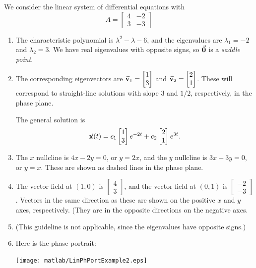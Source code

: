 \newpage

\begin{xexample}
We consider the linear system of differential equations
with
\[
   A = \begin{bmatrix}
            4 & -2 \\ 3 & -3
       \end{bmatrix}
\]
\begin{enumerate}
\item
The characteristic polynomial is
$\lambda^2 -\lambda -6$, and the eigenvalues are
$\lambda_1 = -2$ and $\lambda_2 = 3$.
We have real eigenvalues with opposite signs, so
$\vec{\textbf{0}}$ is a \emph{saddle point}.
\item
The corresponding eigenvectors are
$\vec{\textbf{v}}_1 = \begin{bmatrix} 1 \\ 3 \end{bmatrix}$
and
$\vec{\textbf{v}}_2 = \begin{bmatrix} 2 \\ 1 \end{bmatrix}$.
These will correspond to straight-line solutions with
slope $3$ and $1/2$, respectively, in the phase plane.

The general solution is
\begin{equation}
\vec{\textbf{x}}(t) = c_1 \begin{bmatrix} 1 \\ 3 \end{bmatrix} e^{-2t}
   + c_2 \begin{bmatrix} 2 \\ 1 \end{bmatrix} e^{3t}.
\end{equation}
\item
The $x$ nullcline is $4x-2y=0$, or $y = 2x$, and the
$y$ nullcline is $3x-3y=0$, or $y=x$.  These are shown
as dashed lines in the phase plane.
\item
The vector field at $(1,0)$ is $\begin{bmatrix} 4 \\ 3 \end{bmatrix}$,
and the vector field at $(0,1)$
is $\begin{bmatrix} -2 \\ -3 \end{bmatrix}$.  Vectors in the
same direction as these are shown on the positive $x$ and $y$ axes,
respectively.
(They are in the opposite directions on the negative axes.
\item
(This guideline is not applicable, since the eigenvalues
have opposite signs.)
\item
Here is the phase portrait:

\noindent
\centerline{\texttt{[image: matlab/LinPhPortExample2.eps]}}
\end{enumerate}
\end{xexample}

